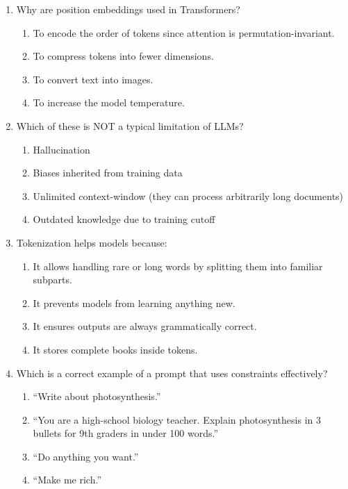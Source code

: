 \documentclass[11pt,a4paper]{article}
\begin{document}
\begin{enumerate}[leftmargin=*, label=\textbf{\#\arabic*}]
  \item Why are position embeddings used in Transformers?\\
    \begin{enumerate}[label=\Alph*)]
      \item To encode the order of tokens since attention is permutation-invariant.
      \item To compress tokens into fewer dimensions.
      \item To convert text into images.
      \item To increase the model temperature.
    \end{enumerate}

  \item Which of these is NOT a typical limitation of LLMs?\\
    \begin{enumerate}[label=\Alph*)]
      \item Hallucination
      \item Biases inherited from training data
      \item Unlimited context-window (they can process arbitrarily long documents)
      \item Outdated knowledge due to training cutoff
    \end{enumerate}

  \item Tokenization helps models because: \\ 
    \begin{enumerate}[label=\Alph*)]
      \item It allows handling rare or long words by splitting them into familiar subparts.
      \item It prevents models from learning anything new.
      \item It ensures outputs are always grammatically correct.
      \item It stores complete books inside tokens.
    \end{enumerate}

  \item Which is a correct example of a prompt that uses constraints effectively?\\
    \begin{enumerate}[label=\Alph*)]
  \item ``Write about photosynthesis.''
  \item ``You are a high-school biology teacher. Explain photosynthesis in 3 bullets for 9th graders in under 100 words.''
  \item ``Do anything you want.''
  \item ``Make me rich.''
    \end{enumerate}


\end{enumerate}
\end{document}
